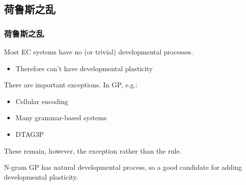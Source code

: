 \documentclass{beamer}
\newcommand{\linespace}{\vskip 0.25cm}
\begin{document}
\subsection{\textbf{荷鲁斯之乱}}

\begin{frame}
	\frametitle{\textbf{荷鲁斯之乱}}
	
	Most EC systems have no (or trivial) developmental processes.
	\begin{itemize}
		\item Therefore can't have developmental plasticity
	\end{itemize}
	
	\linespace
	
	There are important exceptions.  In GP, e.g.:
	\begin{itemize}
		\item Cellular encoding
		\item Many grammar-based systems
		\item DTAG3P
	\end{itemize}
	
	\linespace 
	
	These remain, however, the exception rather than the rule.
	
	\linespace
	
	N-gram GP has natural developmental process, so a good candidate for adding developmental plasticity.
\end{frame}
\end{document}

